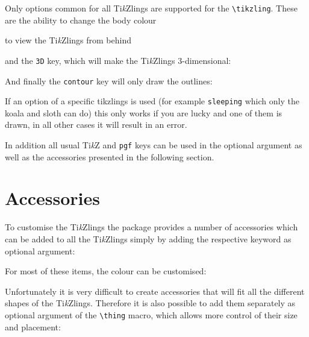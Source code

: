 \documentclass[parskip=half]{scrartcl}
\newcommand{\TikZ}{Ti\emph{k}Z\xspace}
\newcommand{\tikzlings}{Ti\emph{k}Zlings\xspace}
\begin{document}
Only options common for all \tikzlings are supported for the \lstinline|\tikzling|. These are the ability to change the body colour
\begin{tcblisting}{}
\tikzling[body=blue]
\end{tcblisting}

to view the \tikzlings from behind
\begin{tcblisting}{}
\tikzling[back]
\end{tcblisting}

and the \lstinline|3D| key, which will make the Ti\emph{k}Zlings 3-dimensional:
\begin{tcblisting}{}
\tikzling[3D]
\end{tcblisting}

And finally the \lstinline|contour| key will only draw the outlines:
\begin{tcblisting}{}
\tikzling[contour=black]
\end{tcblisting}

If an option of a specific tikzlings is used (for example \lstinline|sleeping| which only the koala and sloth can do) this only works if you are lucky and one of them is drawn, in all other cases it will result in an error. 

In addition all usual \TikZ and \lstinline|pgf| keys can be used in the optional argument as well as the accessories presented in the following section.

%
%
\clearpage
\section{Accessories}

To customise the \tikzlings the package provides a number of accessories which can be added to all the \tikzlings simply by adding the respective keyword as optional argument:

\begin{tcblisting}{}
\bear[hat]
\end{tcblisting}
 
For most of these items, the colour can be customised:

\begin{tcblisting}{}
\koala[crown=orange!50!yellow]
\end{tcblisting}

Unfortunately it is very difficult to create accessories that will fit all the different shapes of the \tikzlings. Therefore it is also possible to add them separately as optional argument of the \lstinline|\thing| macro, which allows more control of their size and placement:
\end{document}
